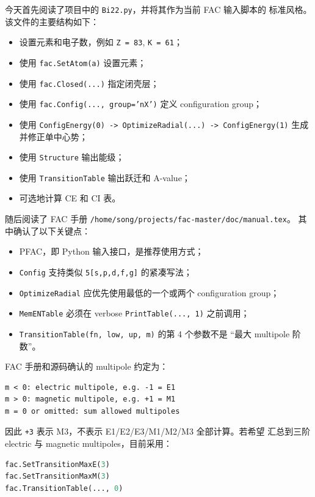 \documentclass[11pt,a4paper]{article}
\begin{document}
今天首先阅读了项目中的 \texttt{Bi22.py}，并将其作为当前 FAC 输入脚本的
标准风格。该文件的主要结构如下：

\begin{itemize}
  \item 设置元素和电子数，例如 \texttt{Z = 83}, \texttt{K = 61}；
  \item 使用 \texttt{fac.SetAtom(a)} 设置元素；
  \item 使用 \texttt{fac.Closed(...)} 指定闭壳层；
  \item 使用 \texttt{fac.Config(..., group='nX')} 定义 configuration group；
  \item 使用
    \texttt{ConfigEnergy(0) -> OptimizeRadial(...) -> ConfigEnergy(1)}
    生成并修正单中心势；
  \item 使用 \texttt{Structure} 输出能级；
  \item 使用 \texttt{TransitionTable} 输出跃迁和 A-value；
  \item 可选地计算 CE 和 CI 表。
\end{itemize}

随后阅读了 FAC 手册 \texttt{/home/song/projects/fac-master/doc/manual.tex}。
其中确认了以下关键点：

\begin{itemize}
  \item PFAC，即 Python 输入接口，是推荐使用方式；
  \item \texttt{Config} 支持类似 \texttt{5[s,p,d,f,g]} 的紧凑写法；
  \item \texttt{OptimizeRadial} 应优先使用最低的一个或两个 configuration group；
  \item \texttt{MemENTable} 必须在 verbose \texttt{PrintTable(..., 1)} 之前调用；
  \item \texttt{TransitionTable(fn, low, up, m)} 的第 4 个参数不是
    ``最大 multipole 阶数''。
\end{itemize}

FAC 手册和源码确认的 multipole 约定为：

\begin{lstlisting}
m < 0: electric multipole, e.g. -1 = E1
m > 0: magnetic multipole, e.g. +1 = M1
m = 0 or omitted: sum allowed multipoles
\end{lstlisting}

因此 \texttt{+3} 表示 M3，不表示 E1/E2/E3/M1/M2/M3 全部计算。若希望
汇总到三阶 electric 与 magnetic multipoles，目前采用：

\begin{lstlisting}[language=Python]
fac.SetTransitionMaxE(3)
fac.SetTransitionMaxM(3)
fac.TransitionTable(..., 0)
\end{lstlisting}
\end{document}
